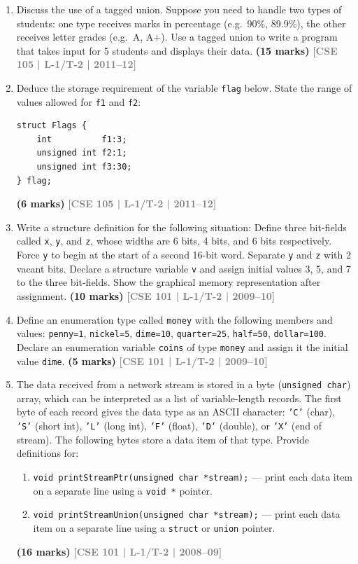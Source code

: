 \documentclass[12pt,a3paper]{article}
\newcommand{\yr}[1]{\hfill\textcolor{gray}{\small\textbf{[#1]}}}
\newcommand{\mk}[1]{\textcolor{orange!70!black}{\small\textbf{(#1 marks)}}}
\begin{document}
\begin{enumerate}
\item Discuss the use of a tagged union. Suppose you need to handle two types of students: one type receives marks in percentage (e.g.\ 90\%, 89.9\%), the other receives letter grades (e.g.\ A, A+). Use a tagged union to write a program that takes input for 5 students and displays their data.
\mk{15} \yr{CSE 105 | L-1/T-2 | 2011--12}

\item Deduce the storage requirement of the variable \texttt{flag} below. State the range of values allowed for \texttt{f1} and \texttt{f2}:
 
\begin{lstlisting}
struct Flags {
    int          f1:3;
    unsigned int f2:1;
    unsigned int f3:30;
} flag;
\end{lstlisting}
\mk{6} \yr{CSE 105 | L-1/T-2 | 2011--12}

\item Write a structure definition for the following situation: Define three bit-fields called \texttt{x}, \texttt{y}, and \texttt{z}, whose widths are 6 bits, 4 bits, and 6 bits respectively. Force \texttt{y} to begin at the start of a second 16-bit word. Separate \texttt{y} and \texttt{z} with 2 vacant bits. Declare a structure variable \texttt{v} and assign initial values 3, 5, and 7 to the three bit-fields. Show the graphical memory representation after assignment.
\mk{10} \yr{CSE 101 | L-1/T-2 | 2009--10}

\item Define an enumeration type called \texttt{money} with the following members and values: \texttt{penny=1}, \texttt{nickel=5}, \texttt{dime=10}, \texttt{quarter=25}, \texttt{half=50}, \texttt{dollar=100}. Declare an enumeration variable \texttt{coins} of type \texttt{money} and assign it the initial value \texttt{dime}.
\mk{5} \yr{CSE 101 | L-1/T-2 | 2009--10}

\item The data received from a network stream is stored in a byte (\texttt{unsigned char}) array, which can be interpreted as a list of variable-length records. The first byte of each record gives the data type as an ASCII character: \texttt{'C'} (char), \texttt{'S'} (short int), \texttt{'L'} (long int), \texttt{'F'} (float), \texttt{'D'} (double), or \texttt{'X'} (end of stream). The following bytes store a data item of that type. Provide definitions for:
\begin{enumerate}
  \item \texttt{void printStreamPtr(unsigned char *stream);} --- print each data item on a separate line using a \texttt{void *} pointer.
  \item \texttt{void printStreamUnion(unsigned char *stream);} --- print each data item on a separate line using a \texttt{struct} or \texttt{union} pointer.
\end{enumerate}
\mk{16} \yr{CSE 101 | L-1/T-2 | 2008--09}


\end{enumerate}
\end{document}
